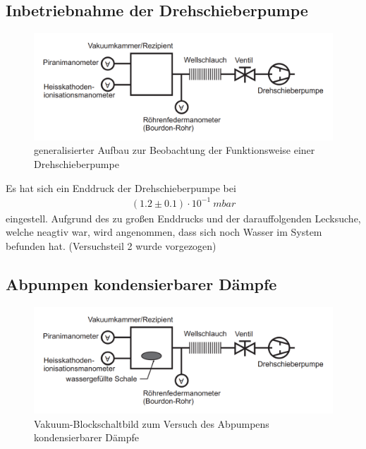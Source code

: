 \documentclass[12pt, a4paper]{scrartcl}
\begin{document}
	\subsection{Inbetriebnahme der Drehschieberpumpe}
	
        \begin{figure}[H]
            \centering
            \includegraphics[width=.5\paperwidth]{aufbau21}
            \caption{generalisierter Aufbau zur Beobachtung der Funktionsweise einer Drehschieberpumpe}
            \label{fig:anord1}
        \end{figure}
    
    	
    	
    	Es hat sich ein Enddruck der Drehschieberpumpe bei \begin{align*}
            (1.2\pm 0.1)\cdot 10^{-1}\ mbar
        \end{align*}
        eingestell.
        Aufgrund des zu großen Enddrucks und der darauffolgenden Lecksuche, welche neagtiv war, wird angenommen, dass sich noch Wasser im System befunden hat. (Versuchsteil 2 wurde vorgezogen)
    
    
    
    \subsection{Abpumpen kondensierbarer Dämpfe}
    
		\begin{figure}[H]
			\centering
			\includegraphics[width=.5\paperwidth]{aufbau22}
			\caption{Vakuum-Blockschaltbild zum Versuch des Abpumpens kondensierbarer Dämpfe}
            \label{fig:anord2}
		\end{figure}
	
\end{document}
